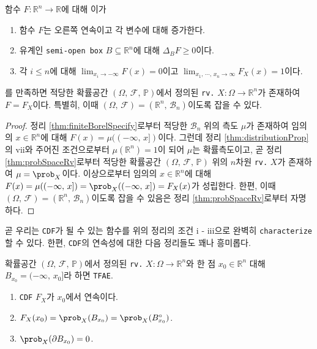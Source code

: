 \begin{theorem}
    함수 $F:\mathbb{R}^n\to\mathbb{R}$에 대해 이가
    \begin{enumerate}
        \item 함수 $F$는 오른쪽 연속이고 각 변수에 대해 증가한다.
        \item 유계인 \texttt{semi-open box} $B\subseteq\mathbb{R}^n$에 대해 $\Delta_BF\geq0$이다.
        \item 각 $i\leq n$에 대해 $\lim_{x_i\to-\infty}F(x)=0$이고 $\lim_{x_1,\,\cdots,\,x_n\to\infty}F_X(x)=1$이다.
    \end{enumerate}
    를 만족하면 적당한 확률공간 $(\Omega,\,\mathcal{F},\,\mathbb{P})$에서 정의된 \texttt{rv.} $X:\Omega\to\mathbb{R}^n$가 존재하여 $F=F_X$이다. 특별히, 이때 $(\Omega,\,\mathcal{F})=(\mathbb{R}^n,\,\mathcal{B}_n)$이도록 잡을 수 있다.
\end{theorem}

\begin{proof}
    정리 \ref{thm:finiteBorelSpecify}로부터 적당한 $\mathcal{B}_n$ 위의 측도 $\mu$가 존재하여 임의의 $x\in\mathbb{R}^n$에 대해 $F(x)=\mu((-\infty,\,x])$이다. 그런데 정리 \ref{thm:distributionProp}의 vii와 주어진 조건으로부터 $\mu(\mathbb{R}^n)=1$이 되어 $\mu$는 확률측도이고, 곧 정리 \ref{thm:probSpaceRv}로부터 적당한 확률공간 $(\Omega,\,\mathcal{F},\,\mathbb{P})$ 위의 $n$차원 \texttt{rv.} $X$가 존재하여 $\mu=\prob_X$이다. 이상으로부터 임의의 $x\in\mathbb{R}^n$에 대해 $F(x)=\mu((-\infty,\,x])=\prob_X((-\infty,\,x])=F_X(x)$가 성립한다. 한편, 이때 $(\Omega,\,\mathcal{F})=(\mathbb{R}^n,\,\mathcal{B}_n)$이도록 잡을 수 있음은 정리 \ref{thm:probSpaceRv}로부터 자명하다.
\end{proof}

곧 우리는 \texttt{CDF}가 될 수 있는 함수를 위의 정리의 조건 i - iii으로 완벽히 \texttt{characterize}할 수 있다. 한편, \texttt{CDF}의 연속성에 대한 다음 정리들도 꽤나 흥미롭다.

\begin{theorem}\label{thm:CDFContinuous}
    확률공간 $(\Omega,\,\mathcal{F},\,\mathbb{P})$에서 정의된 \texttt{rv.} $X:\Omega\to\mathbb{R}^n$와 한 점 $x_0\in\mathbb{R}^n$ 대해 $B_{x_0}=(-\infty,\,x_0]$라 하면 \texttt{TFAE}.
    \begin{enumerate}
        \item \texttt{CDF} $F_X$가 $x_0$에서 연속이다.
        \item $F_X(x_0)=\prob_X(B_{x_0})=\prob_X(B_{x_0}^\circ)$.
        \item $\prob_X(\partial B_{x_0})=0$.
    \end{enumerate}
\end{theorem}

